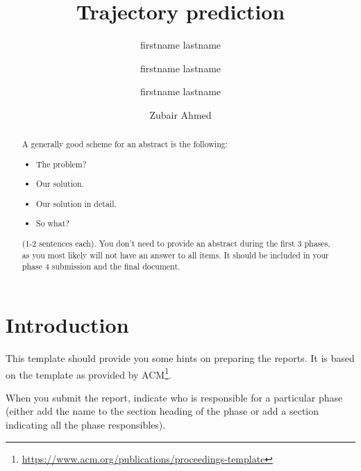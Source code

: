 \documentclass[sigconf]{acmart}
\begin{document}
\title{Trajectory prediction}

\author{firstname lastname}
\affiliation{\institution{}}
  
\author{firstname lastname}
\affiliation{\institution{}}
  
\author{firstname lastname}
\affiliation{\institution{}}
  
\author{Zubair Ahmed}
\affiliation{\institution{}}

\renewcommand{\shortauthors}{Topic 3}

\begin{abstract}
A generally good scheme for an abstract is the following:
\begin{itemize}
 \item The problem?
 \item Our solution.
 \item Our solution in detail.
 \item So what?
\end{itemize}
(1-2 sentences each). 
You don't need to provide an abstract during the first 3 phases, as you most likely will not have an answer to all items.
It should be included in your phase 4 submission and the final document.
\end{abstract}


\maketitle
\section*{Introduction}
This template should provide you some hints on preparing the reports. 
It is based on the template as provided by ACM\footnote{\url{https://www.acm.org/publications/proceedings-template}}.

When you submit the report, indicate who is responsible for a particular phase (either add the name to the section heading of the phase or add a section indicating all the phase responsibles).
\end{document}
